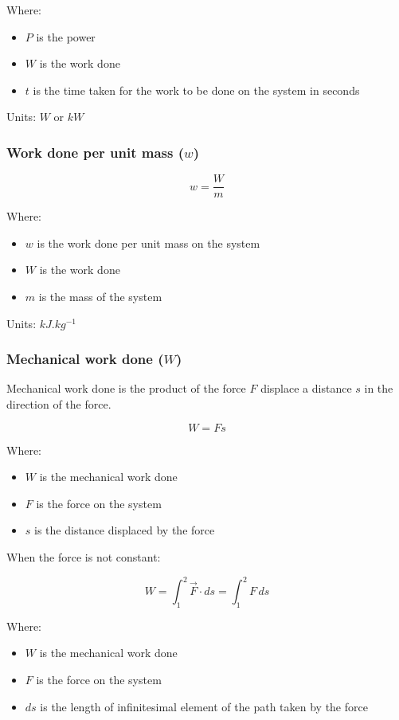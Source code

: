 \documentclass[11pt]{article}
\begin{document}
Where:
\begin{itemize}
\item \(P\) is the power
\item \(W\) is the work done
\item \(t\) is the time taken for the work to be done on the system in seconds
\end{itemize}

Units: \(\unit{W}\) or \(\unit{kW}\)

\newpage

\subsubsection{Work done per unit mass (\(w\))}
\label{sec:org489ffd8}
\[w = \frac{W}{m}\]

Where:
\begin{itemize}
\item \(w\) is the work done per unit mass on the system
\item \(W\) is the work done
\item \(m\) is the mass of the system
\end{itemize}

Units: \(\unit{kJ.kg^{-1}}\)

\subsubsection{Mechanical work done (\(W\))}
\label{sec:org750282b}
Mechanical work done is the product of the force \(F\) displace a distance \(s\) in the direction of the force.

\[W = Fs\]

Where:
\begin{itemize}
\item \(W\) is the mechanical work done
\item \(F\) is the force on the system
\item \(s\) is the distance displaced by the force
\end{itemize}

When the force is not constant:

\[W = \int_1^2 \vec{F} \cdot ds = \int_1^2 F \, ds\]

Where:
\begin{itemize}
\item \(W\) is the mechanical work done
\item \(F\) is the force on the system
\item \(ds\) is the length of infinitesimal element of the path taken by the force
\end{itemize}
\end{document}
